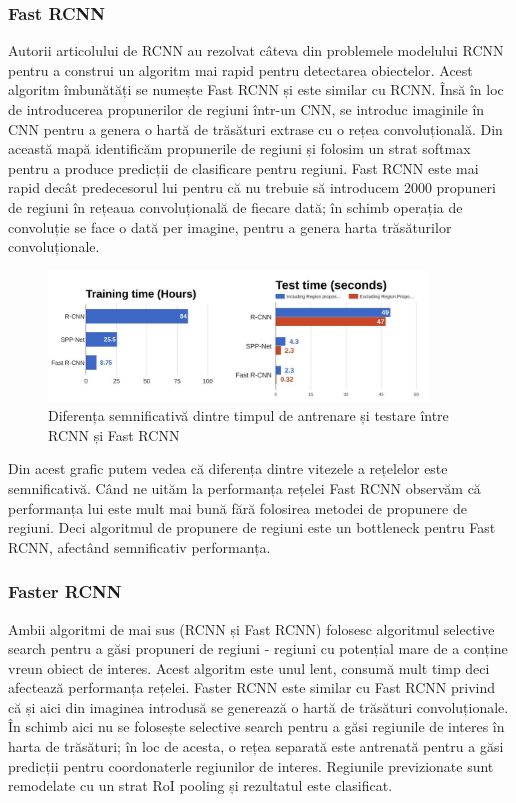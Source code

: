 \subsubsection{Fast RCNN}
Autorii articolului de RCNN au rezolvat câteva din problemele modelului RCNN pentru a construi un algoritm mai rapid pentru detectarea obiectelor. Acest algoritm îmbunătăți se numește Fast RCNN și este similar cu RCNN. Însă în loc de introducerea propunerilor de regiuni într-un CNN, se introduc imaginile în CNN pentru a genera o hartă de trăsături extrase cu o rețea convoluțională. Din această mapă identificăm propunerile de regiuni și folosim un strat softmax pentru a produce predicții de clasificare pentru regiuni.\newline
Fast RCNN este mai rapid decât predecesorul lui pentru că nu trebuie să introducem 2000 propuneri de regiuni în rețeaua convoluțională de fiecare dată; în schimb operația de convoluție se face o dată per imagine, pentru a genera harta trăsăturilor convoluționale.

\begin{figure}[h!]
    	\centering
	\captionsetup{justification=centering, margin=2cm}
	\includegraphics[width=0.9\textwidth]{figures/rcnn_vs_fast_rcnn_time.png}
	\caption{Diferența semnificativă dintre timpul de antrenare și testare între RCNN și Fast RCNN \cite{rcnn_vs_fast_rcnn}}
	\label{fig:class_detect_segment}
\end{figure}
Din acest grafic putem vedea că diferența dintre vitezele a rețelelor este semnificativă. Când ne uităm la performanța rețelei Fast RCNN observăm că performanța lui este mult mai bună fără folosirea metodei de propunere de regiuni. Deci algoritmul de propunere de regiuni este un bottleneck pentru Fast RCNN, afectând semnificativ performanța.

\subsubsection{Faster RCNN}
Ambii algoritmi de mai sus (RCNN și Fast RCNN) folosesc algoritmul selective search pentru a găsi propuneri de regiuni - regiuni cu potențial mare de a conține vreun obiect de interes. Acest algoritm este unul lent, consumă mult timp deci afectează performanța rețelei.\newline
Faster RCNN este similar cu Fast RCNN privind că și aici din imaginea introdusă se generează o hartă de trăsături convoluționale. În schimb aici nu se folosește selective search pentru a găsi regiunile de interes în harta de trăsături; în loc de acesta, o rețea separată este antrenată pentru a găsi predicții pentru coordonaterle regiunilor de interes. Regiunile previzionate sunt remodelate cu un strat RoI pooling și rezultatul este clasificat.

